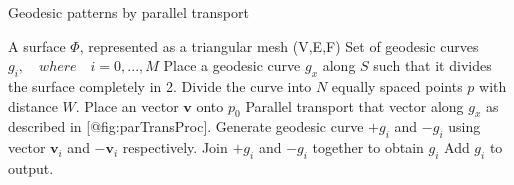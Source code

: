   \usepackage{algorithmic}
  \renewcommand{\algorithmicrequire}{\textbf{Input:}}
  \renewcommand{\algorithmicensure}{\textbf{Output:}}

\begin{algorithm}[H]
\label{parTransPatterns}
\caption{Geodesic patterns by parallel transport}
\renewcommand{\algorithmicrequire}{\textbf{Input:}}
\renewcommand{\algorithmicensure}{\textbf{Output:}}
\scriptsize
\begin{algorithmic}[1]
\REQUIRE A surface $\Phi$, represented as a triangular mesh (V,E,F)
\ENSURE Set of geodesic curves $g_i,\quad where \quad i=0,...,M$
\STATE Place a geodesic curve $g_x$ along $S$ such that it divides the surface completely in 2.
\STATE Divide the curve into $N$ equally spaced points $p$ with distance $W$.
\STATE Place an vector $\mathbf v$  onto $p_0$
\STATE Parallel transport that vector along $g_x$ as described in [@fig:parTransProc].
  \STATE Generate geodesic curve $+g_i$ and $-g_i$ using vector $\mathbf{v}_i$ and $\mathbf{-v}_i$ respectively.
  \STATE Join $+g_i$ and $-g_i$ together to obtain $g_i$
  \STATE Add $g_i$ to output.
\ENDFOR
\end{algorithmic}
\end{algorithm}